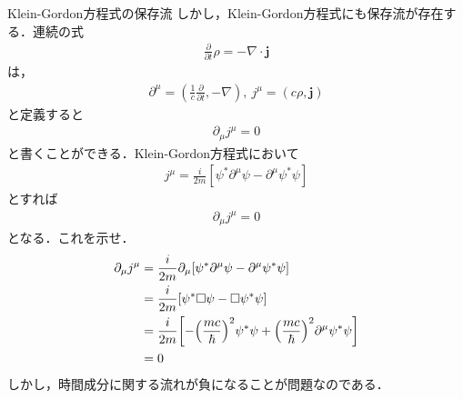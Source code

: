 \documentclass{report}
\begin{document}
    \begin{myexc}{Klein-Gordon方程式の保存流}{}
      しかし，Klein-Gordon方程式にも保存流が存在する．連続の式
      \begin{align}
        \frac{\partial}{\partial t}\rho = -\nabla \cdot \bm{j}
      \end{align}
      は，
      \begin{align}
        \partial^{\mu} = (\frac{1}{c}\frac{\partial}{\partial t}, -\nabla),\ j^\mu = (c\rho, \bm{j})
      \end{align}
      と定義すると
      \begin{align}
        \partial_\mu j^\mu = 0
      \end{align}
      と書くことができる．Klein-Gordon方程式において
      \begin{align}
        j^\mu = \frac{i}{2m}[\psi^{*}\partial^\mu\psi - \partial^\mu \psi^{*}\psi]
      \end{align}
      とすれば
      \begin{align}
        \partial_\mu j^\mu = 0
      \end{align}
      となる．これを示せ．
      \tcblower
      \begin{align}
        \partial_\mu j^\mu &= \frac{i}{2m}\partial_\mu[\psi^{*}\partial^\mu\psi - \partial^\mu \psi^{*}\psi]\\
        &= \frac{i}{2m}[\psi^{*}\Box\psi - \Box \psi^{*}\psi]\\
        &= \frac{i}{2m}\qty[-\qty(\frac{mc}{\hbar})^2\psi^{*}\psi + \qty(\frac{mc}{\hbar})^2 \partial^\mu \psi^{*}\psi]\\
        &= 0
      \end{align}
      しかし，時間成分に関する流れが負になることが問題なのである．
      \end{myexc}
\end{document}
